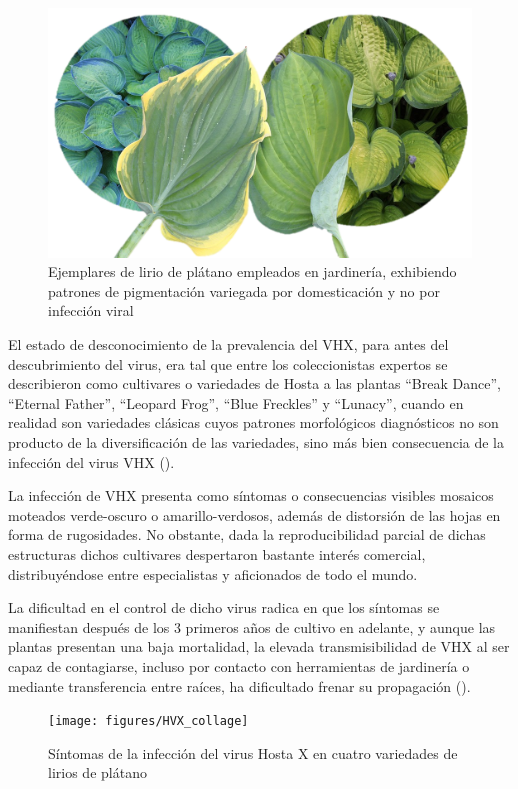 \documentclass[
  12pt, krantz2,
  spanish,
]{krantz}
\begin{document}
\begin{figure}
\includegraphics[width=0.6\linewidth]{figures/hosta_patterns} \caption{Ejemplares de lirio de plátano empleados en jardinería, exhibiendo patrones de pigmentación variegada por domesticación y no por infección viral}\label{fig:hosta}
\end{figure}

El estado de desconocimiento de la prevalencia del VHX, para antes del descubrimiento del virus, era tal que entre los coleccionistas expertos se describieron como cultivares o variedades de Hosta a las plantas ``Break Dance'', ``Eternal Father'', ``Leopard Frog'', ``Blue Freckles'' y ``Lunacy'', cuando en realidad son variedades clásicas cuyos patrones morfológicos diagnósticos no son producto de la diversificación de las variedades, sino más bien consecuencia de la infección del virus VHX (\citet{valverde2012viruses}).

La infección de VHX presenta como síntomas o consecuencias visibles mosaicos moteados verde-oscuro o amarillo-verdosos, además de distorsión de las hojas en forma de rugosidades. No obstante, dada la reproducibilidad parcial de dichas estructuras dichos cultivares despertaron bastante interés comercial, distribuyéndose entre especialistas y aficionados de todo el mundo.

La dificultad en el control de dicho virus radica en que los síntomas se manifiestan después de los 3 primeros años de cultivo en adelante, y aunque las plantas presentan una baja mortalidad, la elevada transmisibilidad de VHX al ser capaz de contagiarse, incluso por contacto con herramientas de jardinería o mediante transferencia entre raíces, ha dificultado frenar su propagación (\citet{valverde2012viruses}).

\begin{figure}
\texttt{[image: figures/HVX\_collage]} \caption{Síntomas de la infección del virus Hosta X en cuatro variedades de lirios de plátano}\label{fig:hostaX}
\end{figure}
\end{document}
